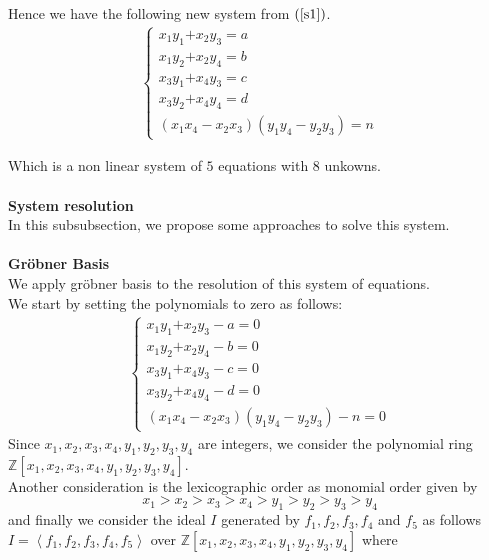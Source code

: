 \documentclass[sigconf,balance=false]{acmart}
\begin{document}
Hence we have the following new system from $\left(\ref{s1}\right)$.
\begin{eqnarray}
	\left\lbrace
	\begin{array}{ll}
	x_{1}y_{1} \text{+} x_{2}y_{3}=a\\
	x_{1}y_{2} \text{+} x_{2}y_{4}=b\\
	x_{3}y_{1} \text{+} x_{4}y_{3}=c\\
	x_{3}y_{2} \text{+} x_{4}y_{4}=d\\
	\left(x_{1}x_{4}-x_{2}x_{3}\right)\left(y_{1}y_{4}-y_{2}y_{3}\right) = n
	\end{array} \right.
\end{eqnarray}

Which is a non linear system of $5$ equations with $8$ unkowns. \\ \\
\textbf{System resolution} \ \\
In this subsubsection, we propose some approaches to solve this system.  \\ \\
\textbf{Gröbner Basis} \ \\
We apply gröbner basis to the resolution of this system of equations.\\
We start by setting the polynomials to zero as follows:
\begin{eqnarray}
	\left\lbrace
	\begin{array}{ll}
	x_{1}y_{1} \text{+} x_{2}y_{3}-a=0\\
	x_{1}y_{2} \text{+} x_{2}y_{4}-b=0\\
	x_{3}y_{1} \text{+} x_{4}y_{3}-c=0\\
	x_{3}y_{2} \text{+} x_{4}y_{4}-d=0\\
	\left(x_{1}x_{4}-x_{2}x_{3}\right)\left(y_{1}y_{4}-y_{2}y_{3}\right)-n=0
	\end{array} \right.
\end{eqnarray}
Since $x_{1}, x_{2}, x_{3}, x_{4}, y_{1}, y_{2}, y_{3}, y_{4}$ are integers, we consider the polynomial ring $\mathbb{Z}\left[x_{1}, x_{2}, x_{3}, x_{4}, y_{1}, y_{2}, y_{3}, y_{4} \right]$.\\
Another consideration is the lexicographic order as monomial order given by $$x_{1}>x_{2}>x_{3}>x_{4}>y_{1}>y_{2}>y_{3}>y_{4}$$ and finally we consider the ideal $I$ generated by $f_{1}, f_{2}, f_{3}, f_{4}$ and $f_{5}$ as follows $I=\left\langle f_{1}, f_{2}, f_{3}, f_{4}, f_{5} \right\rangle$ over $\mathbb{Z}\left[x_{1}, x_{2}, x_{3}, x_{4}, y_{1}, y_{2}, y_{3}, y_{4} \right]$ where 
\end{document}
